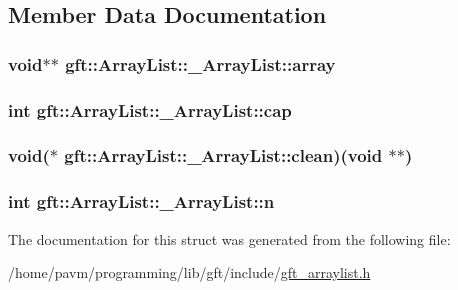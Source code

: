 \subsection{Member Data Documentation}
\hypertarget{structgft_1_1ArrayList_1_1__ArrayList_ad738f27dd09a422d567989d58566cbe6}{
\subsubsection[{array}]{\setlength{\rightskip}{0pt plus 5cm}void$\ast$$\ast$ gft\-::\-Array\-List\-::\-\_\-\-Array\-List\-::array}}\label{structgft_1_1ArrayList_1_1__ArrayList_ad738f27dd09a422d567989d58566cbe6}
\hypertarget{structgft_1_1ArrayList_1_1__ArrayList_a76c12c6e45ba96915e6ba9c1d31286fd}{
\subsubsection[{cap}]{\setlength{\rightskip}{0pt plus 5cm}int gft\-::\-Array\-List\-::\-\_\-\-Array\-List\-::cap}}\label{structgft_1_1ArrayList_1_1__ArrayList_a76c12c6e45ba96915e6ba9c1d31286fd}
\hypertarget{structgft_1_1ArrayList_1_1__ArrayList_a36b14bc3b645579e9a49ca8378d4863e}{
\subsubsection[{clean}]{\setlength{\rightskip}{0pt plus 5cm}void($\ast$ gft\-::\-Array\-List\-::\-\_\-\-Array\-List\-::clean)(void $\ast$$\ast$)}}\label{structgft_1_1ArrayList_1_1__ArrayList_a36b14bc3b645579e9a49ca8378d4863e}
\hypertarget{structgft_1_1ArrayList_1_1__ArrayList_aabc5a9bbc1e57a7e7a9a31db2902df0d}{
\subsubsection[{n}]{\setlength{\rightskip}{0pt plus 5cm}int gft\-::\-Array\-List\-::\-\_\-\-Array\-List\-::n}}\label{structgft_1_1ArrayList_1_1__ArrayList_aabc5a9bbc1e57a7e7a9a31db2902df0d}


The documentation for this struct was generated from the following file\-:\begin{DoxyCompactItemize}
\item 
/home/pavm/programming/lib/gft/include/\hyperlink{gft__arraylist_8h}{gft\-\_\-arraylist.\-h}\end{DoxyCompactItemize}
